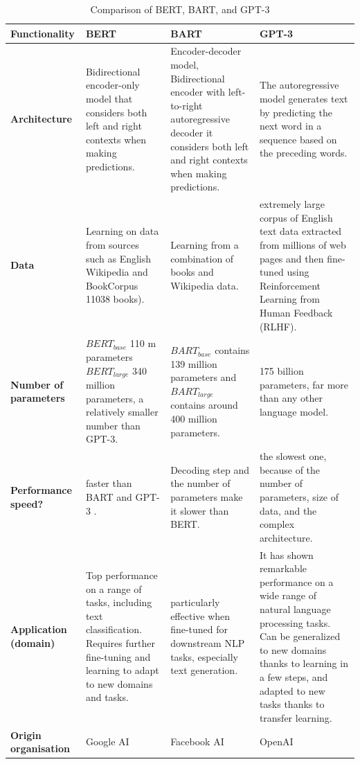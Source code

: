 \begin{table}[t]
	\footnotesize
	
	\caption{Comparison of BERT, BART, and GPT-3} 
	\label{table:bertvsbartvsgpt3}
	\hspace{-2cm}
	\begin{tabular}{ | m{2.5cm}| m{4cm}| m{4.5cm} |m{5.5cm} |  } 
		
		\hline
		\textbf{Functionality}& \textbf{BERT} & \textbf{BART} &\textbf{GPT-3} \\ 
		\hline\hline
		\textbf{Architecture} & Bidirectional encoder-only model that considers both left and right contexts when making predictions. &  Encoder-decoder model, Bidirectional encoder with left-to-right autoregressive decoder it considers both left and right contexts when making predictions. &The autoregressive model generates text by predicting the next word in a sequence based on the preceding words. \\ 
		\hline
		\textbf{Data} & Learning on data from sources such as English Wikipedia and BookCorpus 11038 books). & Learning from a combination of books and Wikipedia data. &  extremely large corpus of English text data extracted from millions of web pages and then fine-tuned using Reinforcement Learning from Human Feedback (RLHF). \\ 
		\hline
		\textbf{Number of parameters }& $BERT_{base}$ 110 m parameters  $BERT_{large}$ 340 million parameters, a relatively smaller number than GPT-3. & $BART_{base}$ contains 139 million parameters and $BART_{large}$ contains around 400 million parameters.&175 billion parameters, far more than any other language model.\\
		\hline
		\textbf{Performance speed?}& faster than BART and GPT-3
		.& Decoding step and the number of parameters make it slower than BERT.& the slowest one, because of the number of parameters, size of data, and the complex architecture.\\
		\hline
		\textbf{Application (domain)}&Top performance on a range of tasks, including text classification.
		Requires further fine-tuning and learning to adapt to new domains and tasks.&particularly effective when fine-tuned for downstream NLP tasks, especially text generation.&It has shown remarkable performance on a wide range of natural language processing tasks.
		Can be generalized to new domains thanks to learning in a few steps, and adapted to new tasks thanks to transfer learning.\\
		\hline
		
		\textbf{Origin organisation}&Google AI&Facebook AI& OpenAI\\
		\hline		
	\end{tabular}
\end{table}


